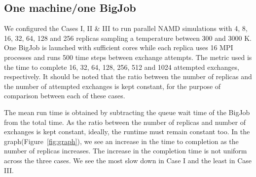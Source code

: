 \documentclass[a4paper,10pt]{article}
\begin{document}


\subsection{One machine/one BigJob}
We configured the Cases I, II \& III to run parallel NAMD simulations with 4, 8, 16, 32, 64, 128 and 256 replicas sampling a temperature between 300 and 3000 K. One BigJob is launched with sufficient cores while each replica uses 16 MPI processes and runs 500 time steps between exchange attempts. The metric used is the time to complete 16, 32, 64, 128, 256, 512 and 1024 attempted exchanges, respectively. It should be noted that the ratio between the number of replicas and the number of attempted exchanges is kept constant, for the purpose of comparison between each of these cases.  %


The mean run time is obtained by subtracting the queue wait time of the BigJob from the total time. As the ratio between the number of replicas and number of exchanges is kept constant, ideally, the runtime must remain constant too. In the graph(Figure~\ref{fig:graph}), we see an increase in the time to completion as the number of replicas increases. The increase in the completion time is not uniform across the three cases. We see the most slow down in Case I and the least in Case III.
\end{document}
